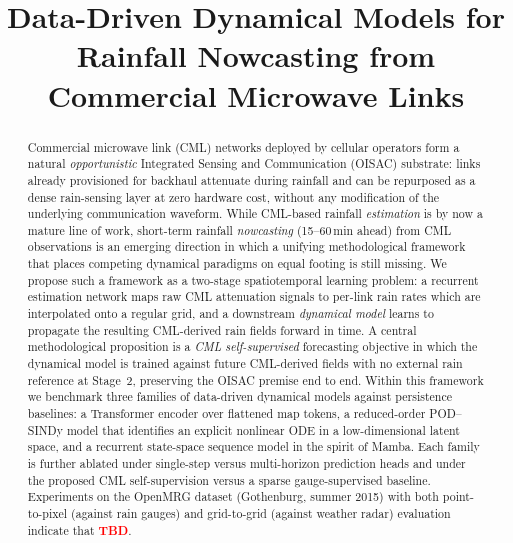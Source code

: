 \documentclass[conference]{IEEEtran}
\newcommand{\tbd}{\textcolor{red}{\textbf{TBD}}}
\begin{document}
\title{Data-Driven Dynamical Models for Rainfall Nowcasting from Commercial Microwave Links}

\author{%
%
}

\maketitle

\begin{abstract}
Commercial microwave link (CML) networks deployed by cellular operators
form a natural \emph{opportunistic} Integrated Sensing and Communication
(OISAC) substrate: links already provisioned for backhaul attenuate
during rainfall and can be repurposed as a dense rain-sensing layer at
zero hardware cost, without any modification of the underlying
communication waveform. While CML-based
rainfall \emph{estimation} is by now a mature line of work, short-term
rainfall \emph{nowcasting} (15--60\,min ahead) from CML observations is
an emerging direction in which a unifying methodological framework that
places competing dynamical paradigms on equal footing is still missing.
We propose such a framework as a two-stage spatiotemporal learning
problem: a recurrent estimation network maps raw CML attenuation signals
to per-link rain rates which are interpolated onto a regular grid, and a
downstream \emph{dynamical model} learns to propagate the resulting
CML-derived rain fields forward in time. A central methodological
proposition is a \emph{CML self-supervised} forecasting objective in
which the dynamical model is trained against future CML-derived fields
with no external rain reference at Stage~2, preserving the OISAC
premise end to end. Within this framework we benchmark three families of data-driven
dynamical models against persistence baselines: a Transformer encoder
over flattened map tokens, a reduced-order POD--SINDy model that
identifies an explicit nonlinear ODE in a low-dimensional latent space,
and a recurrent state-space sequence model in the spirit of Mamba. Each
family is further ablated under single-step versus multi-horizon
prediction heads and under the proposed CML self-supervision versus a
sparse gauge-supervised baseline. Experiments
on the OpenMRG dataset (Gothenburg, summer 2015) with both point-to-pixel
(against rain gauges) and grid-to-grid (against weather radar) evaluation
indicate that \tbd{}.
\end{abstract}
\end{document}
